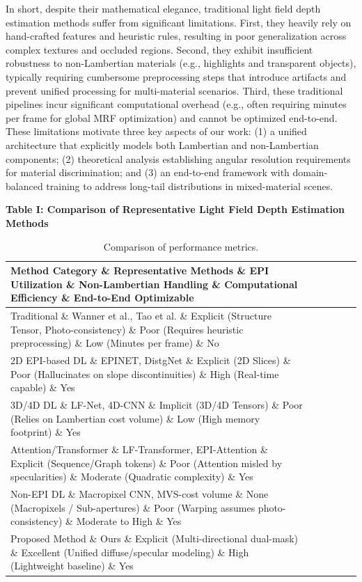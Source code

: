 \documentclass[lettersize,journal]{IEEEtran}
\begin{document}
In short, despite their mathematical elegance, traditional light field depth estimation methods suffer from significant limitations. First, they heavily rely on hand-crafted features and heuristic rules, resulting in poor generalization across complex textures and occluded regions. Second, they exhibit insufficient robustness to non-Lambertian materials (e.g., highlights and transparent objects), typically requiring cumbersome preprocessing steps that introduce artifacts and prevent unified processing for multi-material scenarios. Third, these traditional pipelines incur significant computational overhead (e.g., often requiring minutes per frame for global MRF optimization) and cannot be optimized end-to-end. These limitations motivate three key aspects of our work: (1) a unified architecture that explicitly models both Lambertian and non-Lambertian components; (2) theoretical analysis establishing angular resolution requirements for material discrimination; and (3) an end-to-end framework with domain-balanced training to address long-tail distributions in mixed-material scenes.

\textbf{Table I: Comparison of Representative Light Field Depth Estimation Methods}

\begin{table}[!t]
\small
\caption{Comparison of performance metrics.}
\label{tab:comparison}
\centering
\begin{tabular*}{\textwidth}{@{\extracolsep{\fill}}p{}p{}p{}p{}p{}p{}}
\toprule
Method Category \& Representative Methods \& EPI Utilization \& Non-Lambertian Handling \& Computational Efficiency \& End-to-End Optimizable \\
\midrule
Traditional \& Wanner et al., Tao et al. \& Explicit (Structure Tensor, Photo-consistency) \& Poor (Requires heuristic preprocessing) \& Low (Minutes per frame) \& No \\
2D EPI-based DL \& EPINET, DistgNet \& Explicit (2D Slices) \& Poor (Hallucinates on slope discontinuities) \& High (Real-time capable) \& Yes \\
3D/4D DL \& LF-Net, 4D-CNN \& Implicit (3D/4D Tensors) \& Poor (Relies on Lambertian cost volume) \& Low (High memory footprint) \& Yes \\
Attention/Transformer \& LF-Transformer, EPI-Attention \& Explicit (Sequence/Graph tokens) \& Poor (Attention misled by specularities) \& Moderate (Quadratic complexity) \& Yes \\
Non-EPI DL \& Macropixel CNN, MVS-cost volume \& None (Macropixels / Sub-apertures) \& Poor (Warping assumes photo-consistency) \& Moderate to High \& Yes \\
Proposed Method \& Ours \& Explicit (Multi-directional dual-mask) \& Excellent (Unified diffuse/specular modeling) \& High (Lightweight baseline) \& Yes \\
\bottomrule
\end{tabular*}
\end{table}
\end{document}
